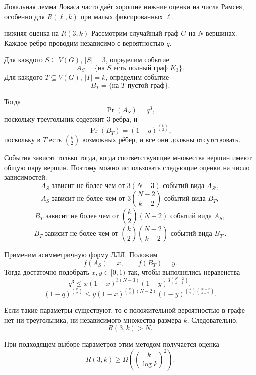\begin{Remark}{}{}
	Локальная лемма Ловаса часто даёт хорошие нижние оценки на числа Рамсея, особенно для
	$R(\ell,k)$ при малых фиксированных $\ell$.
\end{Remark}

\begin{Example}{нижняя оценка на $R(3,k)$}{}
Рассмотрим случайный граф $G$ на $N$ вершинах.
Каждое ребро проводим независимо с вероятностью $q$.

Для каждого $S\subseteq V(G)$, $|S|=3$, определим событие
\[
A_S=\{\text{на $S$ есть полный граф } K_3\}.
\]
Для каждого $T\subseteq V(G)$, $|T|=k$, определим событие
\[
B_T=\{\text{на $T$ пустой граф}\}.
\]

Тогда
\[
\Pr(A_S)=q^3,
\]
поскольку треугольник содержит $3$ ребра, и
\[
\Pr(B_T)=(1-q)^{\binom{k}{2}},
\]
поскольку в $T$ есть $\binom{k}{2}$ возможных рёбер, и все они должны отсутствовать.

События зависят только тогда, когда соответствующие множества вершин имеют общую пару
вершин. Поэтому можно использовать следующие оценки на число зависимостей:
\[
A_S \text{ зависит не более чем от } 3(N-3) \text{ событий вида } A_{S'},
\]
\[
A_S \text{ зависит не более чем от } 3\binom{N-2}{k-2} \text{ событий вида } B_T,
\]
\[
B_T \text{ зависит не более чем от } \binom{k}{2}(N-2) \text{ событий вида } A_S,
\]
\[
B_T \text{ зависит не более чем от } \binom{k}{2}\binom{N-2}{k-2}
\text{ событий вида } B_{T'}.
\]

Применим асимметричную форму ЛЛЛ.
Положим
\[
f(A_S)=x,
\qquad
f(B_T)=y.
\]
Тогда достаточно подобрать $x,y\in[0,1)$ так, чтобы выполнялись неравенства
\[
q^3
\le
x(1-x)^{3(N-3)}
(1-y)^{3\binom{N-2}{k-2}},
\]
\[
(1-q)^{\binom{k}{2}}
\le
y(1-x)^{\binom{k}{2}(N-2)}
(1-y)^{\binom{k}{2}\binom{N-2}{k-2}}.
\]

Если такие параметры существуют, то с положительной вероятностью в графе нет ни треугольника,
ни независимого множества размера $k$.
Следовательно,
\[
R(3,k)>N.
\]

При подходящем выборе параметров этим методом получается оценка
\[
R(3,k)
\ge
\Omega\!\left(\left(\frac{k}{\log k}\right)^2\right).
\]
\end{Example}